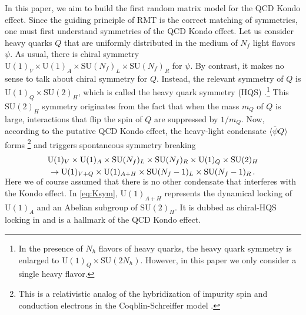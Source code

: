 \documentclass[aps,prd,longbibliography,reprint]{revtex4-2}
\renewcommand{\bar}[1]{\overline{#1}}
\newcommand{\SU}{\text{SU}}
\newcommand{\U}{\text{U}}
\newcommand{\1}{\mathbbm{1}}
\begin{document}
In this paper, we aim to build the first random matrix model for the QCD Kondo effect. Since the guiding principle of RMT is the correct matching of symmetries, one must first understand symmetries of the QCD Kondo effect. Let us consider heavy quarks $Q$ that are uniformly distributed in the medium of $N_f$ light flavors $\psi$. As usual, there is chiral symmetry $\U(1)_V\times\U(1)_A\times\SU(N_f)_L\times\SU(N_f)_R$ for $\psi$. By contrast, it makes no sense to talk about chiral symmetry for $Q$. Instead, the relevant symmetry of $Q$ is $\U(1)_Q \times\SU(2)_H$, which is called the heavy quark symmetry (HQS) \cite{Neubert:1993mb,Neubert:1996wg,manohar_wise_2000,Hosaka:2016ypm}.\footnote{In the presence of $N_h$ flavors of heavy quarks, the heavy quark symmetry is enlarged to $\U(1)_Q\times\SU(2N_h)$. However, in this paper we only consider a single heavy flavor.}  This $\SU(2)_H$ symmetry originates from the fact that when the mass $m_Q$ of $Q$ is large, interactions that flip the spin of $Q$ are suppressed by $1/m_Q$. Now, according to the putative QCD Kondo effect, the heavy-light condensate $\langle \bar\psi Q \rangle$ forms \footnote{This is a relativistic analog of the hybridization of impurity spin and conduction electrons in the Coqblin-Schreiffer model \cite{Read_1983,Bickers:1987zz}.} and triggers spontaneous symmetry breaking \cite{Yasui:2017izi,Yasui:2016svc}
\begin{gather}
	\U(1)_V\times\U(1)_A\times\SU(N_f)_L\times\SU(N_f)_R \times \U(1)_Q \times\SU(2)_H 
	\notag
	\\
	\to \U(1)_{V+Q} \times \U(1)_{A+H} \times \SU(N_f-1)_L \times \SU(N_f-1)_R\,. 
	\label{eq:Ksym}
	\vspace{-3mm}
\end{gather}
Here we of course assumed that there is no other condensate that interferes with the Kondo effect. In \eqref{eq:Ksym}, $\U(1)_{A+H}$ represents the dynamical locking of $\U(1)_A$ and an Abelian subgroup of $\SU(2)_H$. It is dubbed as chiral-HQS locking in \cite{Yasui:2017izi,Yasui:2016svc} and is a hallmark of the QCD Kondo effect. 
\end{document}
